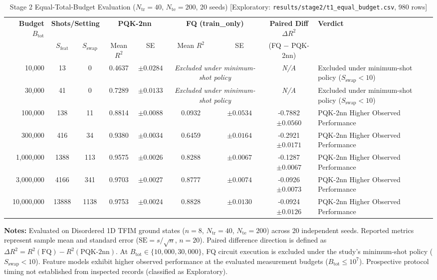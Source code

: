 \begin{table}[!t]
\caption{Stage 2 Equal-Total-Budget Evaluation ($N_{\mathrm{tr}}=40$, $N_{\mathrm{te}}=200$, 20 seeds) [Exploratory: \texttt{results/stage2/t1\_equal\_budget.csv}, 980 rows]}
\label{tab:equal_budget}
\centering
\begingroup
\small
\setlength{\tabcolsep}{4.5pt}
\begin{tabular}{@{}rcccccccl@{}}
\toprule
\textbf{Budget} $B_{\mathrm{tot}}$ & \multicolumn{2}{c}{\textbf{Shots/Setting}} & \multicolumn{2}{c}{\textbf{PQK-2nn}} & \multicolumn{2}{c}{\textbf{FQ (train\_only)}} & \textbf{Paired Diff} $\Delta R^2$ & \textbf{Verdict} \\
\cmidrule(lr){2-3}\cmidrule(lr){4-5}\cmidrule(lr){6-7}\cmidrule(lr){8-8}
 & $S_{\mathrm{feat}}$ & $S_{\mathrm{swap}}$ & Mean $R^2$ & SE & Mean $R^2$ & SE & (FQ $-$ PQK-2nn) & \\
\midrule
10,000 & 13 & 0 & 0.4637 & $\pm 0.0284$ & \multicolumn{2}{c}{\textit{Excluded under minimum-shot policy}} & \textit{N/A} & Excluded under minimum-shot policy ($S_{\mathrm{swap}} < 10$) \\
30,000 & 41 & 0 & 0.7289 & $\pm 0.0133$ & \multicolumn{2}{c}{\textit{Excluded under minimum-shot policy}} & \textit{N/A} & Excluded under minimum-shot policy ($S_{\mathrm{swap}} < 10$) \\
100,000 & 138 & 11 & 0.8814 & $\pm 0.0088$ & 0.0932 & $\pm 0.0534$ & -0.7882 $\pm 0.0560$ & PQK-2nn Higher Observed Performance \\
300,000 & 416 & 34 & 0.9380 & $\pm 0.0034$ & 0.6459 & $\pm 0.0164$ & -0.2921 $\pm 0.0171$ & PQK-2nn Higher Observed Performance \\
1,000,000 & 1388 & 113 & 0.9575 & $\pm 0.0026$ & 0.8288 & $\pm 0.0067$ & -0.1287 $\pm 0.0067$ & PQK-2nn Higher Observed Performance \\
3,000,000 & 4166 & 341 & 0.9703 & $\pm 0.0027$ & 0.8777 & $\pm 0.0074$ & -0.0926 $\pm 0.0073$ & PQK-2nn Higher Observed Performance \\
10,000,000 & 13888 & 1138 & 0.9753 & $\pm 0.0024$ & 0.8828 & $\pm 0.0130$ & -0.0924 $\pm 0.0126$ & PQK-2nn Higher Observed Performance \\
\bottomrule
\end{tabular}
\endgroup
\vspace{1ex}
{\raggedright \footnotesize \textbf{Notes:} Evaluated on Disordered 1D TFIM ground states ($n=8$, $N_{\mathrm{tr}}=40$, $N_{\mathrm{te}}=200$) across 20 independent seeds. Reported metrics represent sample mean and standard error ($\mathrm{SE} = s / \sqrt{n}$, $n=20$). Paired difference direction is defined as $\Delta R^2 = R^2(\mathrm{FQ}) - R^2(\mathrm{PQK\text{-}2nn})$. At $B_{\mathrm{tot}} \in \{10{,}000, 30{,}000\}$, FQ circuit execution is excluded under the study's minimum-shot policy ($S_{\mathrm{swap}} < 10$). Feature models exhibit higher observed performance at the evaluated measurement budgets ($B_{\mathrm{tot}} \le 10^7$). Prospective protocol timing not established from inspected records (classified as Exploratory).\par}
\end{table}
